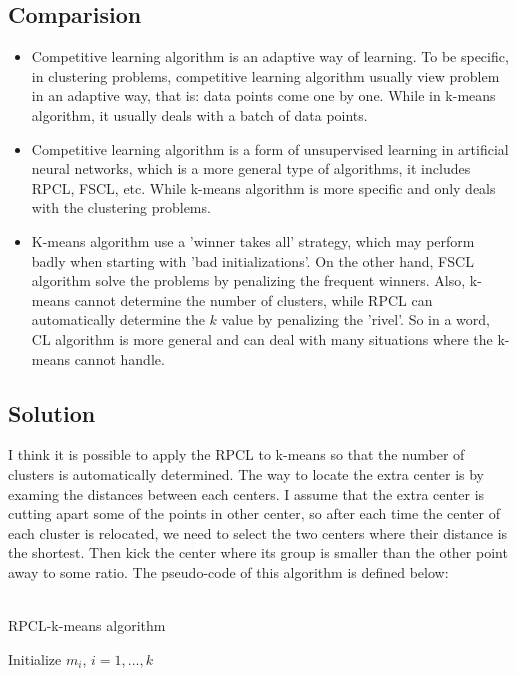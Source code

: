 \documentclass{article}
\theoremstyle{definition}
\numberwithin{equation}{section}
\numberwithin{figure}{section}
\begin{document}
\subsection{Comparision}
\begin{itemize}
\item Competitive learning algorithm is an adaptive way of learning. To be specific, in clustering problems, competitive learning algorithm usually view problem in an adaptive way, that is: data points come one by one. While in k-means algorithm, it usually deals with a batch of data points.
\item Competitive learning algorithm is a form of unsupervised learning in artificial neural networks, which is a more general type of algorithms, it includes RPCL, FSCL, etc. While k-means algorithm is more specific and only deals with the clustering problems.
\item K-means algorithm use a 'winner takes all' strategy, which may perform badly when starting with 'bad initializations'. On the other hand, FSCL algorithm solve the problems by penalizing the frequent winners. Also, k-means cannot determine the number of clusters, while RPCL can automatically determine the $k$ value by penalizing the 'rivel'. So in a word, CL algorithm is more general and can deal with many situations where the k-means cannot handle.

\end{itemize}

\subsection{Solution}
I think it is possible to apply the RPCL to k-means so that the number of clusters is automatically determined. The way to locate the extra center is by examing the distances between each centers. I assume that the extra center is cutting apart some of the points in other center, so after each time the center of each cluster is relocated, we need to select the two centers where their distance is the shortest.
Then kick the center where its group is smaller than the other point away to some ratio.
The pseudo-code of this algorithm is defined below:\\\\
\begin{algorithm}[H]
		\BlankLine
		\caption{RPCL-k-means algorithm}\label{RPCL}
		\BlankLine
        Initialize $m_i$, $i=1,\dots,k$ 
	\end{algorithm}
\end{document}
